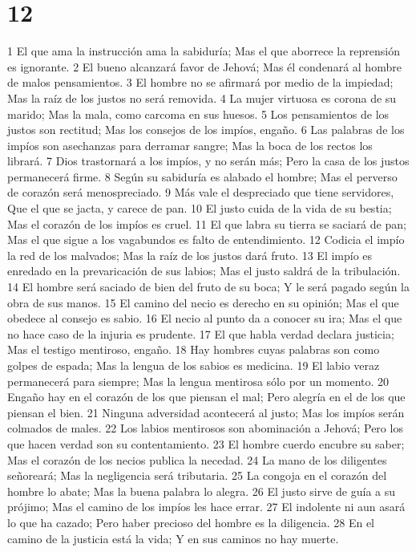 \chapter{12}

1 El que ama la instrucción ama la sabiduría;
Mas el que aborrece la reprensión es ignorante.
2 El bueno alcanzará favor de Jehová;
Mas él condenará al hombre de malos pensamientos.
3 El hombre no se afirmará por medio de la impiedad;
Mas la raíz de los justos no será removida.
4 La mujer virtuosa es corona de su marido;
Mas la mala, como carcoma en sus huesos.
5 Los pensamientos de los justos son rectitud;
Mas los consejos de los impíos, engaño.
6 Las palabras de los impíos son asechanzas para derramar sangre;
Mas la boca de los rectos los librará.
7 Dios trastornará a los impíos, y no serán más;
Pero la casa de los justos permanecerá firme.
8 Según su sabiduría es alabado el hombre;
Mas el perverso de corazón será menospreciado.
9 Más vale el despreciado que tiene servidores,
Que el que se jacta, y carece de pan.
10 El justo cuida de la vida de su bestia;
Mas el corazón de los impíos es cruel.
11 El que labra su tierra se saciará de pan;
Mas el que sigue a los vagabundos es falto de entendimiento.
12 Codicia el impío la red de los malvados;
Mas la raíz de los justos dará fruto.
13 El impío es enredado en la prevaricación de sus labios;
Mas el justo saldrá de la tribulación.
14 El hombre será saciado de bien del fruto de su boca;
Y le será pagado según la obra de sus manos. 
15 El camino del necio es derecho en su opinión;
Mas el que obedece al consejo es sabio.
16 El necio al punto da a conocer su ira;
Mas el que no hace caso de la injuria es prudente.
17 El que habla verdad declara justicia;
Mas el testigo mentiroso, engaño.
18 Hay hombres cuyas palabras son como golpes de espada;
Mas la lengua de los sabios es medicina.
19 El labio veraz permanecerá para siempre;
Mas la lengua mentirosa sólo por un momento.
20 Engaño hay en el corazón de los que piensan el mal;
Pero alegría en el de los que piensan el bien.
21 Ninguna adversidad acontecerá al justo;
Mas los impíos serán colmados de males.
22 Los labios mentirosos son abominación a Jehová;
Pero los que hacen verdad son su contentamiento.
23 El hombre cuerdo encubre su saber;
Mas el corazón de los necios publica la necedad.
24 La mano de los diligentes señoreará;
Mas la negligencia será tributaria.
25 La congoja en el corazón del hombre lo abate;
Mas la buena palabra lo alegra.
26 El justo sirve de guía a su prójimo;
Mas el camino de los impíos les hace errar.
27 El indolente ni aun asará lo que ha cazado;
Pero haber precioso del hombre es la diligencia.
28 En el camino de la justicia está la vida;
Y en sus caminos no hay muerte.

